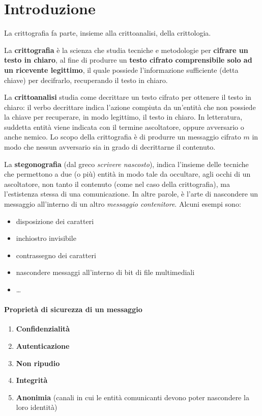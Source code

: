 \chapter{Introduzione}

La crittografia
fa parte, insieme alla crittoanalisi, della crittologia.

\noindent La \textbf{crittografia} è la scienza che studia tecniche e metodologie per \textbf{cifrare un testo in chiaro}, al fine di produrre un 
\textbf{testo cifrato comprensibile solo ad un ricevente legittimo}, il
quale possiede l’informazione sufficiente (detta chiave) per decifrarlo, recuperando il testo in chiaro. 

\noindent La \textbf{crittoanalisi} studia come decrittare un testo cifrato per ottenere il testo in chiaro: il verbo decrittare indica l’azione
compiuta da un’entità che non possiede la chiave per recuperare, in modo legittimo, il testo in chiaro. In letteratura,
suddetta entità viene indicata con il termine ascoltatore, oppure avversario o anche nemico. Lo scopo
della crittografia è di produrre un messaggio cifrato $m$ in modo che nessun avversario sia in grado di decrittarne il contenuto.

\noindent La \textbf{stegonografia} (dal greco \textit{scrivere nascosto}), indica l'insieme delle tecniche che permettono a due (o più) 
entità in modo tale da occultare, agli occhi di un ascoltatore, non tanto il contenuto (come nel caso della crittografia), ma l'estistenza 
stessa di una comunicazione. In altre parole, è l'arte di nascondere un messaggio all'interno di un altro \textit{messaggio contenitore}. Alcuni esempi sono:
\begin{itemize}
    \item disposizione dei caratteri 
    \item inchiostro invisibile
    \item contrassegno dei caratteri 
    \item nascondere messaggi all'interno di bit di file multimediali 
    \item \dots
\end{itemize}

\subsubsection{Proprietà di sicurezza di un messaggio}

\begin{enumerate}
    \item \textbf{Confidenzialità}
    \item \textbf{Autenticazione}
    \item \textbf{Non ripudio}
    \item \textbf{Integrità}
    \item \textbf{Anonimia} (canali in cui le entità comunicanti devono poter nascondere la loro identità)
\end{enumerate}

